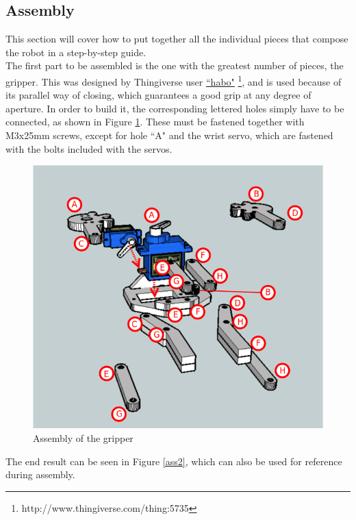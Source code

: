 \subsection{Assembly}

This section will cover how to put together all the individual pieces that compose the robot in a step-by-step guide.\\


The first part to be assembled is the one with the greatest number of pieces, the gripper. This was designed by Thingiverse user \href{http://www.thingiverse.com/thing:5735}{``habo"} \footnote{http://www.thingiverse.com/thing:5735}, and is used because of its parallel way of closing, which guarantees a good grip at any degree of aperture. In order to build it, the corresponding lettered holes simply have to be connected, as shown in Figure \ref{ass1}. These must be fastened together with M3x25mm screws, except for hole ``A" and the wrist servo, which are fastened with the bolts included with the servos.\\

	\begin{figure}[H]
			\centering
			\includegraphics[scale=0.7]{images/Assembly/1-2.png}
			\caption{Assembly of the gripper }
			\label{ass1}
	\end{figure}
	\bigskip

The end result can be seen in Figure \ref{ass2}, which can also be used for reference during assembly.\\


